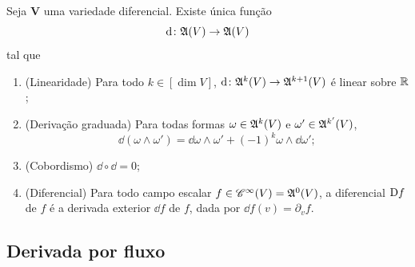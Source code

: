 \begin{proposition}
Seja $\bm V$ uma variedade diferencial. Existe única função
	\begin{equation*}
	\mathrm{d}\colon \mathfrak{A}(V) \to \mathfrak{A}(V)
	\end{equation*}
tal que
	\begin{enumerate}
	\item (Linearidade) Para todo $k \in [\dim V]$, $\mathrm{d}\colon \mathfrak{A}^k(V) \to \mathfrak{A}^{k+1}(V)$ é linear sobre $\mathbb{R}$;
	\item (Derivação graduada) Para todas formas $\omega \in \mathfrak{A}^k (V)$ e $\omega' \in \mathfrak{A}^{k'} (V)$,
		\begin{equation*}
		\dd(\omega \wedge \omega') = \dd\omega \wedge \omega' + (-1)^k\omega \wedge \dd \omega';
		\end{equation*}
	\item (Cobordismo) $\dd \circ \dd = 0$;
	\item (Diferencial) Para todo campo escalar $f \in \mathscr{C}^\infty(V) = \mathfrak{A}^0(V)$, a diferencial $\mathrm{D} f$ de $f$ é a derivada exterior $\dd f$ de $f$, dada por $\dd f(v) = \partial_v f$.
	\end{enumerate}
\end{proposition}








\subsection{Derivada por fluxo}

